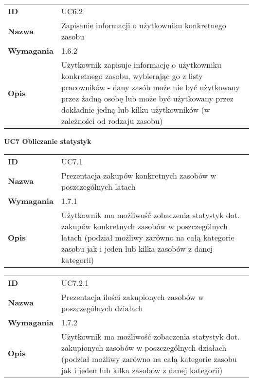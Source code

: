 \vspace{.05\textheight}

\begin{tabular}{p{}p{}}
\hfill {\bf ID} & UC6.2 \\
\hfill {\bf Nazwa} & Zapisanie informacji o użytkowniku konkretnego zasobu \\
\hfill {\bf Wymagania} & 1.6.2 \\
\hfill {\bf Opis} &  Użytkownik zapisuje informację o użytkowniku konkretnego zasobu,  wybierając go z listy pracowników - dany zasób może nie być użytkowany przez żadną osobę lub może być użytkowany przez dokładnie jedną lub kilku użytkowników (w zależności od rodzaju zasobu) \\
\end{tabular}

\vspace{.03\textheight}
\begin{center}
  {\Large\bf UC7 Obliczanie statystyk }
\end{center}
\vspace{.02\textheight}

\begin{tabular}{p{}p{}}
\hfill {\bf ID} & UC7.1 \\
\hfill {\bf Nazwa} &  Prezentacja zakupów konkretnych zasobów w poszczególnych latach \\
\hfill {\bf Wymagania} & 1.7.1 \\
\hfill {\bf Opis} & Użytkownik ma możliwość zobaczenia statystyk dot. zakupów konkretnych zasobów w poszczególnych latach (podział możliwy zarówno na całą kategorie zasobu jak i jeden lub kilka zasobów z danej kategorii) \\
\end{tabular}

\vspace{.05\textheight}

\begin{tabular}{p{}p{}}
\hfill {\bf ID} &  UC7.2.1 \\
\hfill {\bf Nazwa} & Prezentacja ilości zakupionych zasobów w poszczególnych działach \\
\hfill {\bf Wymagania} & 1.7.2 \\
\hfill {\bf Opis} & Użytkownik ma możliwość zobaczenia statystyk dot. zakupionych zasobów w poszczególnych działach (podział możliwy zarówno na całą kategorie zasobu jak i jeden lub kilka zasobów z danej kategorii) \\
\end{tabular}

